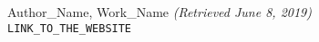 \medskip
 
\begin{thebibliography}{9}

Author_Name, Work_Name \textit{(Retrieved June 8, 2019)}
\\\texttt{LINK_TO_THE_WEBSITE}

%

\end{thebibliography}